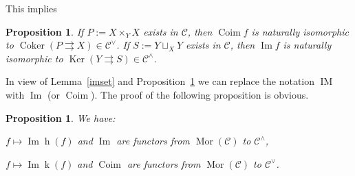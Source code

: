 \documentclass[12pt]{article}
\newtheorem{prop}[thm]{Proposition}
\theoremstyle{remark}
\theoremstyle{definition}
\newcommand{\C}{\mathcal C}
\newcommand{\parar}{\rightrightarrows}\newcommand{\paralelarrows}{\rightrightarrows}%
\DeclareMathOperator{\Coim}{Coim}
\DeclareMathOperator{\Coker}{Coker}
\DeclareMathOperator{\Ima}{Im}
\DeclareMathOperator{\IM}{IM}
\DeclareMathOperator{\hy}{h}
\DeclareMathOperator{\ky}{k}
\DeclareMathOperator{\Ker}{Ker}
\DeclareMathOperator{\Mor}{Mor}
\begin{document}
This implies 
%
\begin{prop}\label{coimim}
If $P:=X\times_YX$ exists in $\C$, then $\Coim f$ is naturally isomorphic to $\Coker(P\parar X)\in\C^\vee$. If $S:=Y\sqcup_XY$ exists in $\C$, then $\Ima f$ is naturally isomorphic to $\Ker(Y\parar S)\in\C^\wedge$. 
\end{prop} 
% 

In view of Lemma~\ref{imset} and Proposition~\ref{coimim} we can replace the notation $\IM$ with $\Ima$ (or $\Coim$). The proof of the following proposition is obvious. 
%
\begin{prop}\label{fun}
We have: 

$f\mapsto\Ima\hy(f)$ and $\Ima$ are functors from $\Mor(\C)$ to $\C^\wedge$, 

$f\mapsto\Ima\ky(f)$ and $\Coim$ are functors from $\Mor(\C)$ to $\C^\vee$. 
%
\end{prop}
%
%
\end{document}
